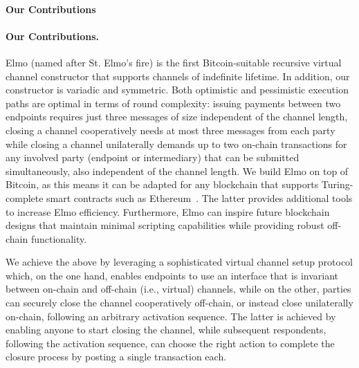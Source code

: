 \makeatletter%
%
  {\paragraph{Our Contributions}}%
  {\paragraph{Our Contributions.}}%
\makeatother%
 Elmo (named after St.
Elmo's fire) is the first Bitcoin-suitable
recursive virtual channel constructor that supports channels
of indefinite lifetime. In addition, our constructor is variadic and symmetric. Both optimistic and
pessimistic execution paths are optimal in terms of round complexity: issuing
payments between two endpoints requires just three messages of size
independent of the channel length, closing a channel cooperatively
needs at most three messages from each party while
closing a channel unilaterally demands up to two on-chain transactions for
any involved party (endpoint or intermediary) that can be submitted
simultaneously, also independent of the channel length. We build Elmo on top
of Bitcoin, as this means it can be adapted for any blockchain that
supports Turing-complete smart contracts such as
Ethereum~\cite{wood2014ethereum}. The latter provides additional tools to
increase Elmo efficiency. Furthermore, Elmo can inspire future
blockchain designs that maintain minimal scripting capabilities while
providing robust off-chain functionality.

We achieve the above by leveraging a sophisticated virtual channel setup
protocol which, on the one hand, enables endpoints to use an interface that is
invariant between on-chain and off-chain (i.e., virtual) channels,
while on the other, parties can securely close the channel cooperatively
off-chain, or instead close unilaterally on-chain, following an arbitrary
activation sequence. The latter is achieved by enabling anyone to
start closing the channel, while subsequent respondents, following the activation sequence, can choose the right action to complete the closure process by posting a single transaction each.

